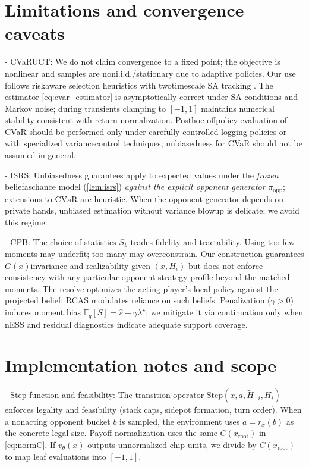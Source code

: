 \documentclass[10pt]{article}
\newcommand{\E}{\mathbb{E}}
\newcommand{\CVaR}{\mathrm{CVaR}}
\newcommand{\1}{\mathbf{1}}
\theoremstyle{plain}
\begin{document}
\section{Limitations and convergence caveats}
- CVaR\textendash UCT: We do not claim convergence to a fixed point; the objective is non\textendash linear and samples are non\textendash i.i.d./stationary due to adaptive policies. Our use follows risk\textendash aware selection heuristics with two\textendash timescale SA tracking \citep{borkar2008sa}. The estimator \eqref{eq:cvar_estimator} is asymptotically correct under SA conditions and Markov noise; during transients clamping to $[-1,1]$ maintains numerical stability consistent with return normalization. Post\textendash hoc off\textendash policy evaluation of CVaR should be performed only under carefully controlled logging policies or with specialized variance\textendash control techniques; unbiasedness for CVaR should not be assumed in general.

- IS\textendash RS: Unbiasedness guarantees apply to expected values under the \emph{frozen} belief\textendash as\textendash chance model (\cref{lem:isrs}) \emph{against the explicit opponent generator} $\pi_{\mathrm{opp}}$; extensions to $\CVaR$ are heuristic. When the opponent generator depends on private hands, unbiased estimation without variance blow\textendash up is delicate; we avoid this regime.

- CPB: The choice of statistics $S_k$ trades fidelity and tractability. Using too few moments may underfit; too many may overconstrain. Our construction guarantees $G(x)$\textendash invariance and realizability given $(x,H_i)$ but does not enforce consistency with any particular opponent strategy profile beyond the matched moments. The re\textendash solve optimizes the acting player’s local policy against the projected belief; RCAS modulates reliance on such beliefs. Penalization ($\gamma>0$) induces moment bias $\E_q[S]=\widehat s-\gamma\lambda^\star$; we mitigate it via continuation only when nESS and residual diagnostics indicate adequate support coverage.

\section{Implementation notes and scope}
- Step function and feasibility: The transition operator $\text{Step}(x,a,\tilde H_{-i},H_i)$ enforces legality and feasibility (stack caps, side\textendash pot formation, turn order). When a non\textendash acting opponent bucket $b$ is sampled, the environment uses $a=r_x(b)$ as the concrete legal size. Payoff normalization uses the same $C(x_{\mathrm{root}})$ in \eqref{eq:normC}. If $v_\theta(x)$ outputs unnormalized chip units, we divide by $C(x_{\mathrm{root}})$ to map leaf evaluations into $[-1,1]$.
\end{document}
